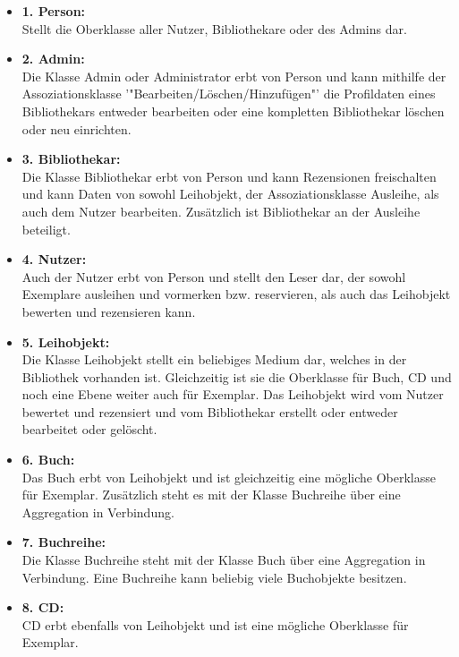 \documentclass[fontsize=12pt,paper=a4,twoside]{scrartcl}
\begin{document}
\begin{itemize}
 \item \textbf{1. Person:}\\
  Stellt die Oberklasse aller Nutzer, Bibliothekare oder 
  des Admins dar.

\item \textbf{2. Admin:}\\
Die Klasse Admin oder Administrator erbt von Person und kann mithilfe der    Assoziationsklasse '"Bearbeiten/Löschen/Hinzufügen"' die Profildaten eines
Bibliothekars entweder bearbeiten oder eine kompletten Bibliothekar löschen 
oder  neu einrichten.
 
\item \textbf{3. Bibliothekar:}\\
Die Klasse Bibliothekar erbt von Person und kann Rezensionen freischalten und
kann Daten von sowohl Leihobjekt, der Assoziationsklasse Ausleihe, als auch 
dem Nutzer bearbeiten. Zusätzlich ist Bibliothekar an der Ausleihe beteiligt.

\item \textbf{4. Nutzer:}\\
Auch der Nutzer erbt von Person und stellt den Leser dar, der sowohl Exemplare
ausleihen und vormerken bzw. reservieren, als auch das Leihobjekt bewerten und 
rezensieren kann.

\item \textbf{5. Leihobjekt:}\\
Die Klasse Leihobjekt stellt ein beliebiges Medium dar, welches in der 
Bibliothek vorhanden ist. Gleichzeitig ist sie die Oberklasse für Buch,
CD und noch eine Ebene weiter auch für Exemplar. Das Leihobjekt wird vom Nutzer
bewertet und rezensiert und vom Bibliothekar erstellt oder entweder bearbeitet 
oder gelöscht.

\item \textbf{6. Buch:}\\
Das Buch erbt von Leihobjekt und ist gleichzeitig eine mögliche Oberklasse
für Exemplar. Zusätzlich steht es mit der Klasse Buchreihe über eine Aggregation
in Verbindung. 

\item \textbf{7. Buchreihe:}\\
Die Klasse Buchreihe steht mit der Klasse Buch über eine Aggregation in Verbindung.
Eine Buchreihe kann beliebig viele Buchobjekte besitzen.
 
\item \textbf{8. CD:}\\
CD erbt ebenfalls von Leihobjekt und ist eine mögliche Oberklasse für Exemplar.


\end{itemize}
\end{document}
